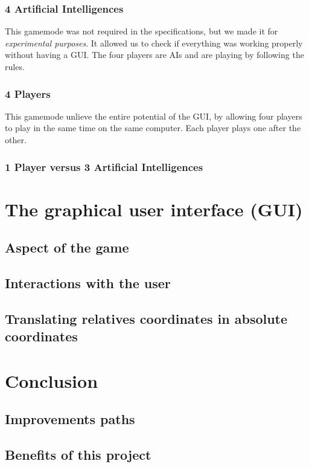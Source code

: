 \documentclass[english, 11pt, titlepage]{article}
\begin{document}
    \subsubsection{4 Artificial Intelligences}
    This gamemode was not required in the specifications, but we made it for \emph{experimental purposes}. It allowed us to check if everything was working properly without having a GUI. The four players are AIs and are playing by following the rules.
    \subsubsection{4 Players}
    This gamemode unlieve the entire potential of the GUI, by allowing four players to play in the same time on the same computer. Each player plays one after the other.

    \subsubsection{1 Player versus 3 Artificial Intelligences}

    \section{The graphical user interface (GUI)}
    \subsection{Aspect of the game}
    \subsection{Interactions with the user}
    \subsection{Translating relatives coordinates in absolute coordinates}

    \section{Conclusion}
    \subsection{Improvements paths}
    \subsection{Benefits of this project}
    \label{section:translating_coordinates}
\end{document}
